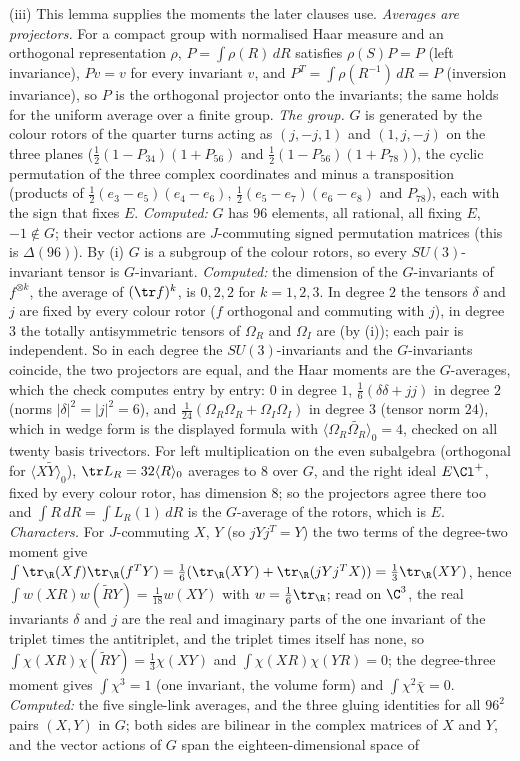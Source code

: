 (iii) This lemma supplies the moments the later clauses use. \emph{Averages are projectors.} For a compact group with normalised Haar measure and an orthogonal representation $\rho$, $P = \int\rho(R)\,dR$ satisfies $\rho(S)P = P$ (left invariance), $Pv = v$ for every invariant $v$, and $P^{T} = \int\rho(R^{-1})\,dR = P$ (inversion invariance), so $P$ is the orthogonal projector onto the invariants; the same holds for the uniform average over a finite group. \emph{The group.} $G$ is generated by the colour rotors of the quarter turns acting as $(j, -j, 1)$ and $(1, j, -j)$ on the three planes ($\tfrac12(1 - P_{34})(1 + P_{56})$ and $\tfrac12(1 - P_{56})(1 + P_{78})$), the cyclic permutation of the three complex coordinates and minus a transposition (products of $\tfrac12(e_3 - e_5)(e_4 - e_6)$, $\tfrac12(e_5 - e_7)(e_6 - e_8)$ and $P_{78}$), each with the sign that fixes $E$. \emph{Computed:} $G$ has $96$ elements, all rational, all fixing $E$, $-1 \notin G$; their vector actions are $J$-commuting signed permutation matrices (this is $\Delta(96)$). By (i) $G$ is a subgroup of the colour rotors, so every $SU(3)$-invariant tensor is $G$-invariant. \emph{Computed:} the dimension of the $G$-invariants of $f^{\otimes k}$, the average of $(\tr f)^{k}$, is $0, 2, 2$ for $k = 1, 2, 3$. In degree $2$ the tensors $\delta$ and $j$ are fixed by every colour rotor ($f$ orthogonal and commuting with $j$), in degree $3$ the totally antisymmetric tensors of $\Omega_R$ and $\Omega_I$ are (by (i)); each pair is independent. So in each degree the $SU(3)$-invariants and the $G$-invariants coincide, the two projectors are equal, and the Haar moments are the $G$-averages, which the check computes entry by entry: $0$ in degree $1$, $\tfrac16(\delta\delta + jj)$ in degree $2$ (norms $|\delta|^2 = |j|^2 = 6$), and $\tfrac1{24}(\Omega_R\Omega_R + \Omega_I\Omega_I)$ in degree $3$ (tensor norm $24$), which in wedge form is the displayed formula with $\langle\Omega_R\widetilde{\Omega_R}\rangle_0 = 4$, checked on all twenty basis trivectors. For left multiplication on the even subalgebra (orthogonal for $\langle X\widetilde{Y}\rangle_0$), $\tr L_R = 32\langle R\rangle_0$ averages to $8$ over $G$, and the right ideal $E\Cl^{+}$, fixed by every colour rotor, has dimension $8$; so the projectors agree there too and $\int R\,dR = \int L_R(1)\,dR$ is the $G$-average of the rotors, which is $E$. \emph{Characters.} For $J$-commuting $X$, $Y$ (so $jYj^{T} = Y$) the two terms of the degree-two moment give $\int\tr_{\R}(Xf)\tr_{\R}(f^{T}Y) = \tfrac16(\tr_{\R}(XY) + \tr_{\R}(jYj^{T}X)) = \tfrac13\tr_{\R}(XY)$, hence $\int w(XR)w(\widetilde{R}Y) = \tfrac1{18}w(XY)$ with $w = \tfrac16\tr_{\R}$; read on $\C^3$, the real invariants $\delta$ and $j$ are the real and imaginary parts of the one invariant of the triplet times the antitriplet, and the triplet times itself has none, so $\int\chi(XR)\chi(\widetilde{R}Y) = \tfrac13\chi(XY)$ and $\int\chi(XR)\chi(YR) = 0$; the degree-three moment gives $\int\chi^3 = 1$ (one invariant, the volume form) and $\int\chi^2\bar\chi = 0$. \emph{Computed:} the five single-link averages, and the three gluing identities for all $96^2$ pairs $(X, Y)$ in $G$; both sides are bilinear in the complex matrices of $X$ and $Y$, and the vector actions of $G$ span the eighteen-dimensional space of 
